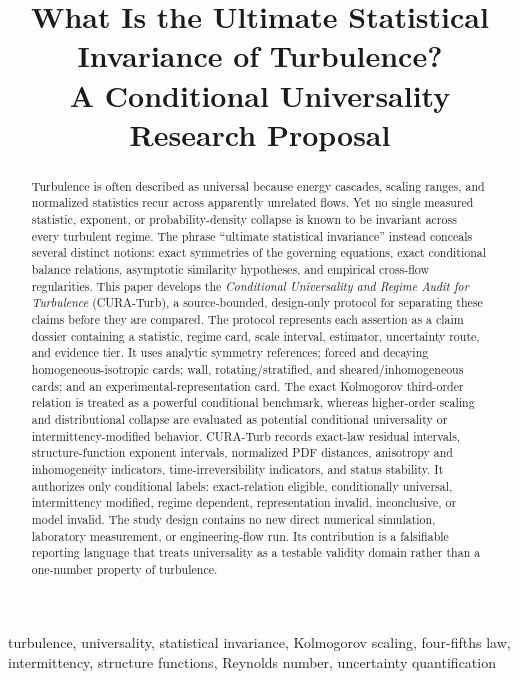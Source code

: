\documentclass[conference]{../../../../Conference-LaTeX-template_10-17-19/IEEEtran}
\title{What Is the Ultimate Statistical Invariance of Turbulence?\\A Conditional Universality Research Proposal}
\author{\IEEEauthorblockN{Anonymous Research Proposal}}
\begin{document}
\maketitle

\begin{abstract}
Turbulence is often described as universal because energy cascades, scaling ranges, and normalized statistics recur across apparently unrelated flows. Yet no single measured statistic, exponent, or probability-density collapse is known to be invariant across every turbulent regime. The phrase ``ultimate statistical invariance'' instead conceals several distinct notions: exact symmetries of the governing equations, exact conditional balance relations, asymptotic similarity hypotheses, and empirical cross-flow regularities. This paper develops the \emph{Conditional Universality and Regime Audit for Turbulence} (CURA-Turb), a source-bounded, design-only protocol for separating these claims before they are compared. The protocol represents each assertion as a claim dossier containing a statistic, regime card, scale interval, estimator, uncertainty route, and evidence tier. It uses analytic symmetry references; forced and decaying homogeneous-isotropic cards; wall, rotating/stratified, and sheared/inhomogeneous cards; and an experimental-representation card. The exact Kolmogorov third-order relation is treated as a powerful conditional benchmark, whereas higher-order scaling and distributional collapse are evaluated as potential conditional universality or intermittency-modified behavior. CURA-Turb records exact-law residual intervals, structure-function exponent intervals, normalized PDF distances, anisotropy and inhomogeneity indicators, time-irreversibility indicators, and status stability. It authorizes only conditional labels: exact-relation eligible, conditionally universal, intermittency modified, regime dependent, representation invalid, inconclusive, or model invalid. The study design contains no new direct numerical simulation, laboratory measurement, or engineering-flow run. Its contribution is a falsifiable reporting language that treats universality as a testable validity domain rather than a one-number property of turbulence.
\end{abstract}

\begin{IEEEkeywords}
turbulence, universality, statistical invariance, Kolmogorov scaling, four-fifths law, intermittency, structure functions, Reynolds number, uncertainty quantification
\end{IEEEkeywords}
\end{document}
